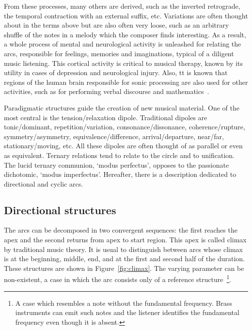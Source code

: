 From these processes, many others are derived, such as the inverted retrograde, the temporal contraction with an external suffix, etc. Variations are often thought about in the terms above but are also often very loose, such as an arbitrary shuffle of the notes in a melody which the composer finds interesting. As a result, a whole process of mental and neurological activity is unleashed for relating the arcs, responsible for feelings, memories and imaginations, typical of a diligent music listening. This cortical activity is critical to
musical therapy, known by its utility in cases of depression and neurological injury. Also, tt is known that regions of the human brain responsible for sonic processing are also used for other activities, such as for performing verbal discourse and mathematics~\cite{Sacks,Roederer}.

Paradigmatic structures guide the creation of new musical material.
One of the most central is the tension/relaxation dipole. Traditional dipoles are tonic/dominant, repetition/variation,
consonance/dissonance, coherence/rupture, symmetry/asymmetry,
equivalence/difference, arrival/departure, near/far, stationary/moving,
etc. All these dipoles are often thought of as parallel or even as equivalent. Ternary relations tend to relate to the circle and to unification. The
lucid ternary communion, `modus perfectus', opposes to the passionate
dichotomic, `modus imperfectus'. Hereafter, there is a description dedicated to
directional and cyclic arcs.

\subsection{Directional structures}\label{subsec:dir}
The arcs can be decomposed in two convergent sequences: the first reaches the apex and the second returns from apex to start region.
This apex is called climax by traditional music theory. It is
usual to distinguish between arcs whose climax is at the beginning, middle, end,
and at the first and second half of the duration. These structures are
shown in Figure~\ref{fig:climax}. The varying parameter can be non-existent, a case in which
the arc consists only of a reference structure~\cite{Schoenberg}\footnote{A case which resembles a note without the fundamental frequency. Brass instruments can emit such notes and the listener identifies the fundamental frequency even though it is absent.}.


